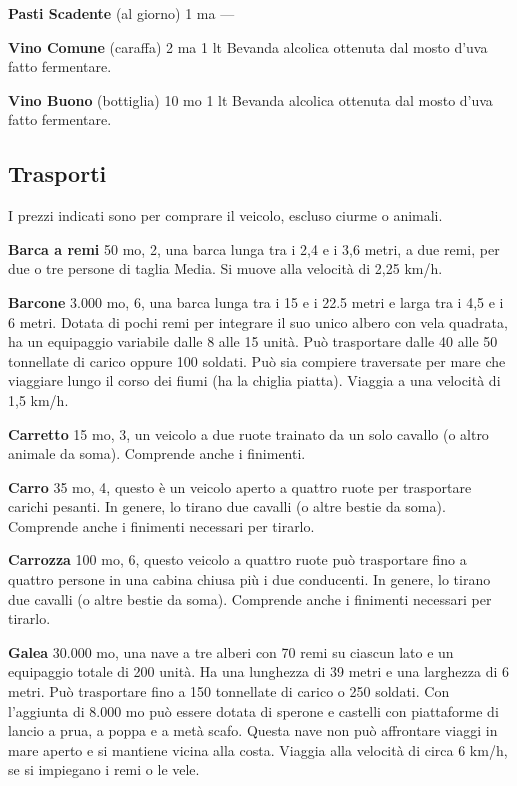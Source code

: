 \documentclass[a4paper,11pt,twoside,openany]{book}
\begin{document}
{\textbf{Pasti Scadente} (al giorno) 1 ma ---

\textbf{Vino Comune} (caraffa) 2 ma 1 lt Bevanda alcolica ottenuta dal mosto d'uva fatto fermentare.

\textbf{Vino Buono} (bottiglia) 10 mo 1 lt Bevanda alcolica ottenuta dal mosto d'uva fatto fermentare.

\pagebreak

\subsection{Trasporti}

\label{trasporti}

I prezzi indicati sono per comprare il veicolo, escluso ciurme o animali.

\textbf{Barca a remi} 50 mo, 2, una barca lunga tra i 2,4 e i 3,6 metri, a due remi, per due o tre persone di taglia Media. Si muove alla velocità di 2,25 km/h.

\textbf{Barcone} 3.000 mo, 6, una barca lunga tra i 15 e i 22.5 metri e larga tra i 4,5 e i 6 metri. Dotata di pochi remi per integrare il suo unico albero con vela quadrata, ha un equipaggio variabile dalle 8 alle 15 unità. Può trasportare dalle 40 alle 50 tonnellate di carico oppure 100 soldati. Può sia compiere traversate per mare che viaggiare lungo il corso dei fiumi (ha la chiglia piatta). Viaggia a una velocità di 1,5 km/h.

\textbf{Carretto} 15 mo, 3, un veicolo a due ruote trainato da un solo cavallo (o altro animale da soma). Comprende anche i finimenti.

\textbf{Carro} 35 mo, 4, questo è un veicolo aperto a quattro ruote per trasportare carichi pesanti. In genere, lo tirano due cavalli (o altre bestie da soma). Comprende anche i finimenti necessari per tirarlo.

\textbf{Carrozza} 100 mo, 6, questo veicolo a quattro ruote può trasportare fino a quattro persone in una cabina chiusa più i due conducenti. In genere, lo tirano due cavalli (o altre bestie da soma). Comprende anche i finimenti necessari per tirarlo.

\textbf{Galea} 30.000 mo, una nave a tre alberi con 70 remi su ciascun lato e un equipaggio totale di 200 unità. Ha una lunghezza di 39 metri e una larghezza di 6 metri.
Può trasportare fino a 150 tonnellate di carico o 250 soldati. Con l'aggiunta di 8.000 mo può essere dotata di sperone e castelli con piattaforme di lancio a prua, a poppa e a metà scafo. Questa nave non può affrontare viaggi in mare aperto e si mantiene vicina alla costa.
Viaggia alla velocità di circa 6 km/h, se si impiegano i remi o le vele.

}
\end{document}
